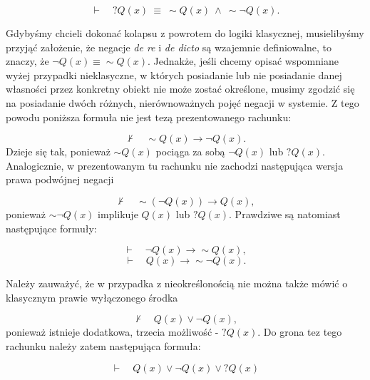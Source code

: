 \begin{equation}
   \vdash \quad ?Q(x)\ \equiv\ \sim\! Q(x)\ \land\ \sim\!\neg Q(x).
\end{equation}
 



Gdybyśmy chcieli dokonać kolapsu z powrotem do logiki klasycznej,
musielibyśmy przyjąć założenie, że negacje \textit{de re} i \textit{de
dicto} są wzajemnie definiowalne, to znaczy, że
$\neg Q(x) \equiv \sim\!Q(x)$. Jednakże, jeśli
chcemy opisać wspomniane wyżej przypadki nieklasyczne, w których
posiadanie lub nie posiadanie danej własności przez konkretny obiekt
nie może zostać określone, musimy zgodzić się na posiadanie dwóch
różnych, nierównoważnych pojęć negacji w systemie. Z tego powodu
poniższa formuła nie jest tezą prezentowanego rachunku:


\begin{equation}
    \nvdash \quad \sim\! Q(x) \to  \neg Q(x).
\end{equation}
Dzieje się tak, ponieważ $\sim\!Q(x)$ pociąga za sobą $\neg Q(x)$ lub
$?Q(x)$. Analogicznie, w prezentowanym tu rachunku nie zachodzi
następująca wersja prawa podwójnej negacji



\begin{equation}
   \nvdash \quad  \sim\! (\neg Q(\textit{x})) \to  Q(\textit{x}),
\end{equation}
ponieważ $\sim\!\neg Q(x)$ implikuje $Q(x)$ lub $?Q(x)$. Prawdziwe są
natomiast następujące formuły:



\begin{equation}
    \vdash \quad \neg Q(x) \to  \sim\! Q(x),
\end{equation}
\begin{equation}
    \vdash \quad Q(x) \to  \sim\! \neg Q(x).
\end{equation}






Należy zauważyć, że w przypadka z nieokreślonością nie można także mówić
o klasycznym prawie wyłączonego środka


\begin{equation}
     \nvdash \quad Q(x) \lor \neg Q(x),
\end{equation}
ponieważ istnieje dodatkowa, trzecia możliwość - $?Q(x)$. Do grona tez tego
rachunku należy zatem następująca formuła:

\begin{equation}
    \vdash \quad Q(x) \lor  \neg Q(x) \lor  ?Q(x)
\end{equation}


